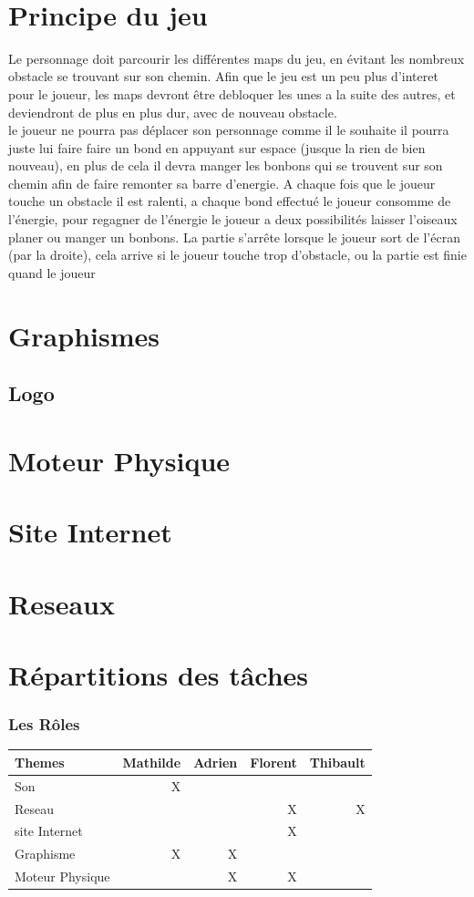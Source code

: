 \documentclass [11pt]{report}
\begin{document}
	\newpage\

\chapter{Principe du jeu}
Le personnage doit parcourir les différentes maps du jeu, en évitant les nombreux obstacle se trouvant sur son chemin. Afin que le jeu est un peu plus d'interet pour le joueur, les maps devront être debloquer les unes a la suite des autres, et deviendront de plus en plus dur, avec de nouveau obstacle.\\
le joueur ne pourra pas déplacer son personnage comme il le souhaite il pourra juste lui faire faire un bond en appuyant sur espace (jusque la rien de bien nouveau), en plus de cela il devra manger les bonbons qui se trouvent sur son chemin afin de faire remonter sa barre d'energie. A chaque fois que le joueur touche un obstacle il est ralenti, a chaque bond effectué le joueur consomme de l'énergie, pour regagner de l'énergie le joueur a deux possibilités laisser l'oiseaux planer ou manger un bonbons. La partie s'arrête lorsque le joueur sort de l'écran (par la droite), cela arrive si le joueur touche trop d'obstacle, ou la partie est finie quand le joueur 


\chapter {Graphismes}
	\section {Logo}
\chapter {Moteur Physique}
\chapter {Site Internet}
\chapter {Reseaux}
\chapter{Répartitions des tâches}
	\subsection{Les Rôles}
		\begin{tabular}{| l |*{4} {r|}}
		\hline
		Themes & Mathilde & Adrien & Florent & Thibault \\
		\hline
		Son & X & & & \\
		\hline
		Reseau & & & X & X \\
		\hline
		site Internet & & & X & \\
		\hline
		Graphisme & X & X & & \\
		\hline
		Moteur Physique & & X & X & \\
		\hline
		\end{tabular}
\end{document}
